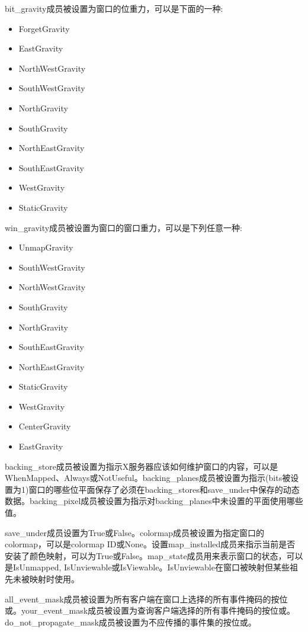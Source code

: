 \noindent bit\_gravity成员被设置为窗口的位重力，可以是下面的一种:

\begin{itemize}
	\item ForgetGravity
	\item EastGravity
	\item NorthWestGravity
	\item SouthWestGravity
	\item NorthGravity
	\item SouthGravity
	\item NorthEastGravity
	\item SouthEastGravity
	\item WestGravity 
	\item StaticGravity
\end{itemize}

\noindent win\_gravity成员被设置为窗口的窗口重力，可以是下列任意一种:
\begin{itemize}
	\item UnmapGravity
	\item SouthWestGravity
	\item NorthWestGravity
	\item SouthGravity
	\item NorthGravity
	\item SouthEastGravity
	\item NorthEastGravity
	\item StaticGravity
	\item WestGravity
	\item CenterGravity
	\item EastGravity
\end{itemize}

backing\_store成员被设置为指示X服务器应该如何维护窗口的内容，可以是WhenMapped、Always或NotUseful。backing\_planes成员被设置为指示(bits被设置为1)窗口的哪些位平面保存了必须在backing\_stores和save\_under中保存的动态数据。backing\_pixel成员被设置为指示对backing\_planes中未设置的平面使用哪些值。

save\_under成员设置为True或False。colormap成员被设置为指定窗口的colormap，可以是colormap ID或None。设置map\_installed成员来指示当前是否安装了颜色映射，可以为True或False。map\_state成员用来表示窗口的状态，可以是IsUnmapped, IsUnviewable或IsViewable。IsUnviewable在窗口被映射但某些祖先未被映射时使用。

all\_event\_mask成员被设置为所有客户端在窗口上选择的所有事件掩码的按位或。your\_event\_mask成员被设置为查询客户端选择的所有事件掩码的按位或。do\_not\_propagate\_mask成员被设置为不应传播的事件集的按位或。

